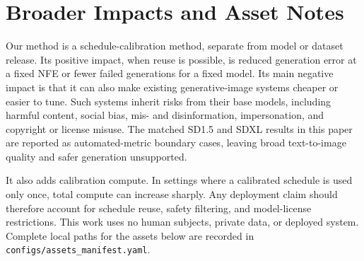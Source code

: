 \section{Broader Impacts and Asset Notes}
\label{app:responsible-assets}

Our method is a schedule-calibration method, separate from model or dataset
release. Its
positive impact, when reuse is possible, is reduced generation error at a fixed
NFE or fewer failed generations for a fixed model. Its main negative impact is
that it can also make existing generative-image systems cheaper or easier to
tune. Such systems inherit risks from their base models, including harmful
content, social bias, mis- and disinformation, impersonation, and copyright or
license misuse. The matched SD1.5 and SDXL results in this paper are reported
as automated-metric boundary cases, leaving broad text-to-image quality and
safer generation unsupported.

It also adds calibration compute. In settings where a calibrated
schedule is used only once, total compute can increase sharply. Any
deployment claim should therefore account for schedule reuse, safety filtering,
and model-license restrictions. This work uses no human subjects, private data,
or deployed system. Complete local paths for the assets below are recorded in
\texttt{configs/assets\_manifest.yaml}.

